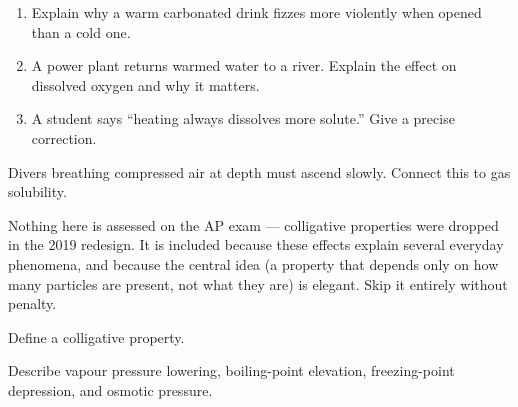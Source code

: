 \documentclass{apchem-notes}
\begin{document}

\begin{enumerate}[leftmargin=*,itemsep=0.4em]
  \item Explain why a warm carbonated drink fizzes more violently when
        opened than a cold one. 
  \item A power plant returns warmed water to a river. Explain the effect on
        dissolved oxygen and why it matters.
  \item A student says ``heating always dissolves more solute.'' Give a
        precise correction. 
\end{enumerate}

\begin{exitticket}
Divers breathing compressed air at depth must ascend slowly. Connect this to
gas solubility. 
\end{exitticket}


\begin{apcnote}
Nothing here is assessed on the AP exam --- colligative properties were
dropped in the 2019 redesign. It is included because these effects explain
several everyday phenomena, and because the central idea (a property that
depends only on how many particles are present, not what they are) is
elegant. Skip it entirely without penalty.
\end{apcnote}

\begin{objectives}
  \item Define a colligative property.
  \item Describe vapour pressure lowering, boiling-point elevation,
        freezing-point depression, and osmotic pressure.
\end{objectives}
\end{document}
